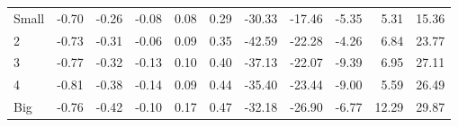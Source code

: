 \begin{table}[!ht]
\begin{tabular}{lrrrrrrrrrr}
    \\
      \cmidrule(r){2-6} \cmidrule(r){7-11}

    Small   & -0.70  & -0.26  & -0.08  & 0.08  & 0.29  & -30.33  & -17.46  & -5.35  & 5.31  & 15.36  \\
         2  & -0.73  & -0.31  & -0.06  & 0.09  & 0.35  & -42.59  & -22.28  & -4.26  & 6.84  & 23.77  \\
         3  & -0.77  & -0.32  & -0.13  & 0.10  & 0.40  & -37.13  & -22.07  & -9.39  & 6.95  & 27.11  \\
         4  & -0.81  & -0.38  & -0.14  & 0.09  & 0.44  & -35.40  & -23.44  & -9.00  & 5.59  & 26.49  \\
    Big     & -0.76  & -0.42  & -0.10  & 0.17  & 0.47  & -32.18  & -26.90  & -6.77  & 12.29  & 29.87  \\

  

  \bottomrule
\end{tabular}
\label{tbl:25_Size_Prior_C1997}
\end{table}